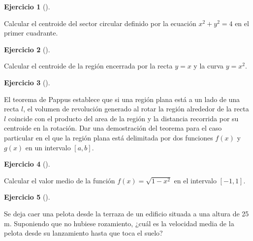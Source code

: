 \documentclass[
  a4paper,
]{scrreport}
\theoremstyle{definition}
\newtheorem{exercise}{Ejercicio}[chapter]
\theoremstyle{remark}
\begin{document}
\begin{exercise}[]\protect\hypertarget{exr-centro-masas-3}{}\label{exr-centro-masas-3}

Calcular el centroide del sector circular definido por la ecuación
\(x^2+y^2=4\) en el primer cuadrante.

\end{exercise}

\begin{exercise}[]\protect\hypertarget{exr-centro-masas-3}{}\label{exr-centro-masas-3}

Calcular el centroide de la región encerrada por la recta \(y=x\) y la
curva \(y=x^2\).

\end{exercise}

\begin{exercise}[]\protect\hypertarget{exr-teorema-pappus}{}\label{exr-teorema-pappus}

El teorema de Pappus establece que si una región plana está a un lado de
una recta \(l\), el volumen de revolución generado al rotar la región
alrededor de la recta \(l\) coincide con el producto del area de la
región y la distancia recorrida por su centroide en la rotación. Dar una
demostración del teorema para el caso particular en el que la región
plana está delimitada por dos funciones \(f(x)\) y \(g(x)\) en un
intervalo \([a,b]\).

\end{exercise}

\begin{exercise}[]\protect\hypertarget{exr-valor-medio-1}{}\label{exr-valor-medio-1}

Calcular el valor medio de la función \(f(x)=\sqrt{1-x^2}\) en el
intervalo \([-1,1]\).

\end{exercise}

\begin{exercise}[]\protect\hypertarget{exr-velocidad-media}{}\label{exr-velocidad-media}

Se deja caer una pelota desde la terraza de un edificio situada a una
altura de 25 m. Suponiendo que no hubiese rozamiento, ¿cuál es la
velocidad media de la pelota desde su lanzamiento hasta que toca el
suelo?

\end{exercise}
\end{document}
